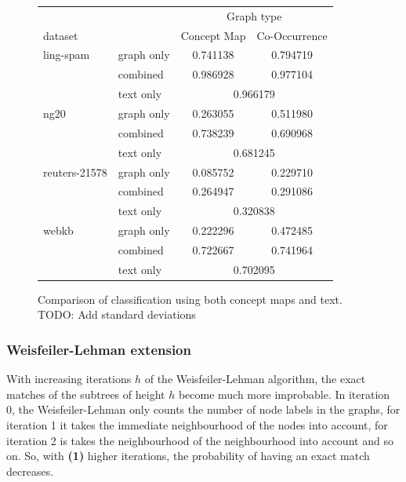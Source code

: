 \begin{figure}[htb!]
\centering
\begin{tabular}{llcc}
  &  & \multicolumn{2}{c}{Graph type} \\
   dataset   & &  Concept Map &  Co-Occurrence \\
\midrule
ling-spam 
          & graph only &  0.741138 &  0.794719\\
          & combined &  0.986928 &  0.977104\\
          & text only & \multicolumn{2}{c}{ 0.966179 }\\
\midrule
ng20 
          & graph only &  0.263055 &  0.511980\\
          & combined &  0.738239 &  0.690968\\
          & text only & \multicolumn{2}{c}{ 0.681245 }\\
\midrule
reuters-21578 
          & graph only &  0.085752 &  0.229710\\
          & combined &  0.264947 &  0.291086\\
          & text only & \multicolumn{2}{c}{ 0.320838 }\\
\midrule
webkb 
          & graph only &  0.222296 &  0.472485\\
          & combined &  0.722667 &  0.741964\\
          & text only & \multicolumn{2}{c}{ 0.702095 }\\	
\bottomrule
\end{tabular}
\caption{Comparison of classification using both concept maps and text. TODO: Add standard deviations}%
\label{fig:results_comparison_combined}
\end{figure}


\subsubsection{Weisfeiler-Lehman extension}
With increasing iterations $h$ of the Weisfeiler-Lehman algorithm, the exact matches of the subtrees of height $h$ become much more improbable.
In iteration 0, the Weisfeiler-Lehman only counts the number of node labels in the graphs, for iteration 1 it takes the immediate neighbourhood of the nodes into account, for iteration 2 is takes the neighbourhood of the neighbourhood into account and so on.
So, with \textbf{(1)} higher iterations, the probability of having an exact match decreases.

